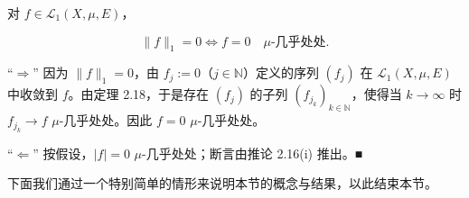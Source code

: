 \begin{corollary}

对 $ f \in \mathcal{L}_1(X,\mu,E) $，

\[
\|f\|_1 = 0 \iff f = 0 \quad \mu\text{-几乎处处} .
\]

\proofhead
“$ \Rightarrow $” 因为 $ \|f\|_1 = 0 $，由 $ f_j := 0 $（$ j \in \mathbb{N} $）定义的序列 $ (f_j) $ 在 $ \mathcal{L}_1(X,\mu,E) $ 中收敛到 $ f $。由定理 2.18，于是存在 $ (f_j) $ 的子列 $ (f_{j_k})_{k \in \mathbb{N}} $，使得当 $ k \to \infty $ 时 $ f_{j_k} \to f $ $ \mu $-几乎处处。因此 $ f = 0 $ $ \mu $-几乎处处。

“$ \Leftarrow $” 按假设，$ |f| = 0 $ $ \mu $-几乎处处；断言由推论 2.16(i) 推出。\nobreak\hspace{0.35em}■
\end{corollary}

下面我们通过一个特别简单的情形来说明本节的概念与结果，以此结束本节。

